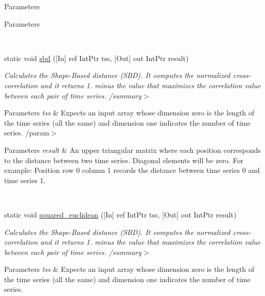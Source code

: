 \begin{DoxyCompactItemize}
\begin{DoxyCompactList}
\begin{DoxyParams}{Parameters}
\begin{DoxyParams}{Parameters}
\hline
\end{DoxyParams}
\\
\hline
\end{DoxyParams}
\end{DoxyCompactList}\item 
static void \mbox{\hyperlink{classkhiva_1_1interop_1_1_d_l_l_distances_a5286690f1572dc2f1a71e8bc85c3266a}{sbd}} (\mbox{[}In\mbox{]} ref Int\+Ptr tss, \mbox{[}Out\mbox{]} out Int\+Ptr result)
\begin{DoxyCompactList}\small\item\em Calculates the Shape-\/\+Based distance (S\+BD). It computes the normalized cross-\/correlation and it returns 1. minus the value that maximizes the correlation value between each pair of time series. /summary$>$ 
\begin{DoxyParams}{Parameters}
{\em tss} & Expects an input array whose dimension zero is the length of the time series (all the same) and dimension one indicates the number of time series. /param$>$ 
\begin{DoxyParams}{Parameters}
{\em result} & An upper triangular matrix where each position corresponds to the distance between two time series. Diagonal elements will be zero. For example\+: Position row 0 column 1 records the distance between time series 0 and time series 1.\\
\hline
\end{DoxyParams}
\\
\hline
\end{DoxyParams}
\end{DoxyCompactList}\item 
static void \mbox{\hyperlink{classkhiva_1_1interop_1_1_d_l_l_distances_a3a8cc5cc29f67e204899e32694bd1bc7}{squared\+\_\+euclidean}} (\mbox{[}In\mbox{]} ref Int\+Ptr tss, \mbox{[}Out\mbox{]} out Int\+Ptr result)
\begin{DoxyCompactList}\small\item\em Calculates the Shape-\/\+Based distance (S\+BD). It computes the normalized cross-\/correlation and it returns 1. minus the value that maximizes the correlation value between each pair of time series. /summary$>$ 
\begin{DoxyParams}{Parameters}
{\em tss} & Expects an input array whose dimension zero is the length of the time series (all the same) and dimension one indicates the number of time series.\\
\hline
\end{DoxyParams}
\end{DoxyCompactList}\end{DoxyCompactItemize}


